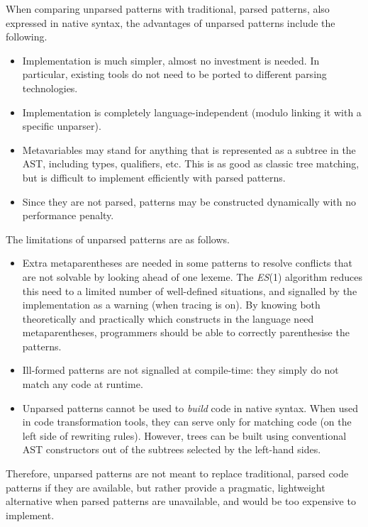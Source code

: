 When comparing unparsed patterns with traditional, parsed patterns,
also expressed in native syntax, the advantages of unparsed patterns
include the following.
\begin{itemize}

  \item Implementation is much simpler, almost no investment is
    needed. In particular, existing tools do not need to be ported to
    different parsing technologies.

  \item Implementation is completely language\hyp{}independent (modulo
    linking it with a specific unparser).

  \item Meta\-variables may stand for anything that is represented as
    a subtree in the AST, including types, qualifiers, etc. This is as
    good as classic tree matching, but is difficult to implement
    efficiently with parsed patterns.

  \item Since they are not parsed, patterns may be constructed
    dynamically with no performance penalty.

\end{itemize}
The limitations of unparsed patterns are as follows.
\begin{itemize}

  \item Extra meta\-parentheses are needed in some patterns to resolve
    conflicts that are not solvable by looking ahead of one
    lexeme. The \textit{ES}(1) algorithm reduces this need to a
    limited number of well\hyp{}defined situations, and signalled by
    the implementation as a warning (when tracing is on). By knowing
    both theoretically and practically which constructs in the
    language need meta\-parentheses, programmers should be able to
    correctly parenthesise the patterns.

  \item Ill\hyp{}formed patterns are not signalled at
    compile\hyp{}time: they simply do not match any code at
    runtime.

  \item Unparsed patterns cannot be used to \emph{build} code in
    native syntax. When used in code transformation tools, they can
    serve only for matching code (on the left side of rewriting
    rules). However, trees can be built using conventional AST
    constructors out of the subtrees selected by the left\hyp{}hand
    sides.

\end{itemize}
Therefore, unparsed patterns are not meant to replace traditional,
parsed code patterns if they are available, but rather provide a
pragmatic, lightweight alternative when parsed patterns are
unavailable, and would be too expensive to implement.
